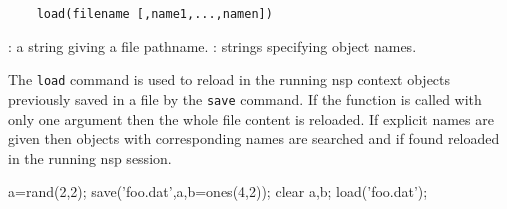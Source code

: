 \begin{mandesc}
\end{mandesc}
\label{load}
\begin{calling_sequence}
  \begin{verbatim}
    load(filename [,name1,...,namen])  
  \end{verbatim}
\end{calling_sequence}
\begin{parameters}
  \begin{varlist}
     : a string giving a file pathname.
     : strings specifying object names. 
  \end{varlist}
\end{parameters}
\begin{mandescription}
  The \verb!load! command is used to reload in the running nsp context 
  objects previously saved in a file by the \verb!save! command. 
  If the function is called with only one argument then the 
  whole file content is reloaded. If explicit names are given then 
  objects with corresponding names are searched and if found reloaded in 
  the running nsp session. 
\end{mandescription}
\begin{examples}
  \begin{program}
    a=rand(2,2);
    save('foo.dat',a,b=ones(4,2));
    clear a,b;
    load('foo.dat');
  \end{program}
\end{examples}
\begin{manseealso}
\end{manseealso}

